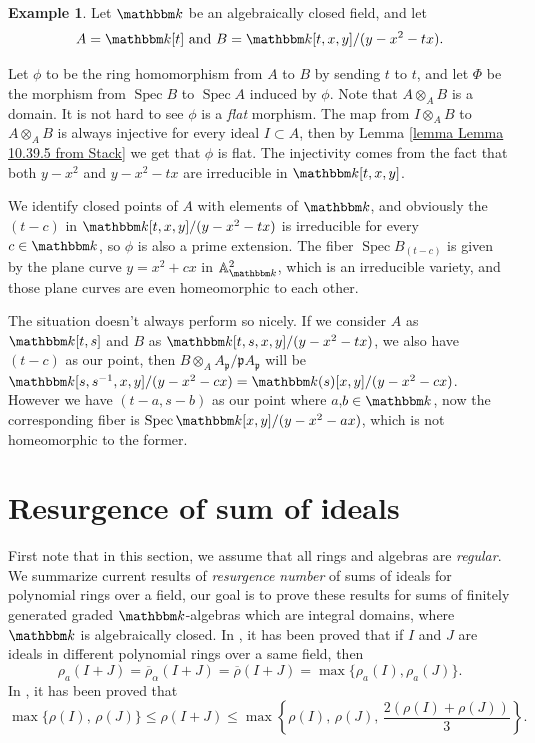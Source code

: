 \documentclass[12pt]{amsart}
\numberwithin{equation}{section}
\theoremstyle{definition}
\newtheorem{example}[theorem]{Example}
\DeclareMathOperator{\Spec}{Spec}
\newcommand{\kk}{{\mathbbm k}}
\begin{document}
\begin{example}
	Let $\kk$ be an algebraically closed field, and let 
	$$	A =  \kk [t]  \text{ and }B = \kk [t,x,y]/(y - x^2 - tx).$$
	
	Let $\phi$ to be the ring homomorphism from $A$ to $B$ by sending $t$ to $t$, and let $\Phi$ be the morphism from $\Spec B$ to $\Spec A$ induced by $\phi$. Note that $A\otimes_AB$ is a domain. It is not hard to see $\phi$ is a \textit{flat} morphism. The map from $I \otimes_A B$ to $A \otimes_A B$ is always injective for every ideal $I \subset A$, then by Lemma \ref{lemma Lemma 10.39.5 from Stack} we get that $\phi$ is flat. The injectivity comes from the fact that both $y - x^2$ and $y - x^2 - tx$ are irreducible in $\kk[t,x,y]$.
	
	
	We identify closed points of $A$ with elements of $\kk$, and obviously the $(t - c)$ in $\kk [t,x,y]/(y - x^2 - tx)$ is irreducible for every $c \in \kk$, so $\phi$ is also a prime extension. The fiber $\Spec B_{(t-c)}$ is given by the plane curve $y = x^2 + cx$ in $\mathbb{A}_\kk^2$, which is an irreducible variety, and those plane curves are even homeomorphic to each other. 
	
	The situation doesn't always perform so nicely. If we consider $A$ as $\kk[t,s]$ and $B$ as $\kk[t,s,x,y] / (y - x^2 -tx)$, we also have $(t - c)$ as our point, then $B \otimes_A A_{\mathfrak{p}} / \mathfrak{p} A_{\mathfrak{p}}$ will be $\kk[s,s^{-1},x,y] / (y - x^2 -cx) = \kk(s)[x,y] / (y - x^2 -cx)$. However we have $(t-a, s-b)$ as our point where $a$,$b \in \kk$, now the corresponding fiber is $\Spec \kk[x,y] / (y - x^2 - ax)$, which is not homeomorphic to the former.
\end{example}







	
	\section{Resurgence of sum of ideals} \label{section: resurgence of sum of ideals}
	
	First note that in this section, we assume that all rings and algebras are \emph{regular}. We summarize current results of \emph{resurgence number} of sums of ideals for polynomial rings over a field, our goal is to prove these results for sums of finitely generated graded {$\kk$-algebras} which are integral domains, where $\kk$ is algebraically closed. In \cite[Theorem 2.6]{fiberprojective}, it has been proved that if %
	$I$ and $J$ are ideals in different polynomial rings over a same field, then
$$	\rho_a(I + J) = \overline{\rho}_{\alpha}(I + J) = \overline{\rho}(I + J) = {\max}\{ \rho_a(I),  \rho_a(J) \} .$$ 
	In \cite[Theorem 2.3]{sharpbound}, it has been proved that 
	 $$
	\max \{ \rho(I), \, \rho(J) \} \leqslant \rho(I + J) \leqslant \max \left\{ \rho(I), \, \rho(J), \, \frac{2 (\rho(I) + \rho(J))}{3} \right\}.
	$$
\end{document}
